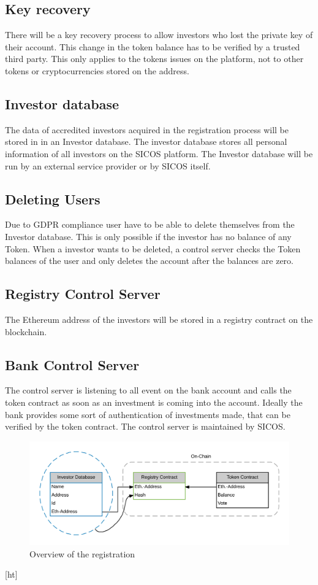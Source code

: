\documentclass[11pt]{article}
\begin{document}
\subsection{Key recovery}
There will be a key recovery process to allow investors who lost the private key of their account. This change in the token balance has to be verified by a trusted third party. This only applies to the tokens issues on the platform, not to other tokens or cryptocurrencies stored on the address. 


\subsection{Investor database}
The data of accredited investors acquired in the registration process will be stored in in an Investor database.
The investor database stores all personal information of all investors on the SICOS platform. The Investor database will be run by an external service provider or by SICOS itself. 


\subsection{Deleting Users}

Due to GDPR compliance user have to be able to delete themselves from the Investor database. This is only possible if the investor has no balance of any Token. When a investor wants to be deleted, a control server checks the Token balances of the user and only deletes the account after the balances are zero.

\subsection{Registry Control Server}

 The Ethereum address of the investors will be stored in a registry contract on the blockchain.

\subsection{Bank Control Server}
The control server is listening to all event on the bank account and calls the token contract as soon as an investment is coming into the account. Ideally the bank provides  some sort of authentication of investments made, that can be verified by the token contract. 
The control server is maintained by SICOS.


 \begin{figure}[ht]
\includegraphics[scale=0.20]{Sicos-Base-Reg-Token.png}
\caption{Overview of the registration }    
\end{figure}[ht]  
\end{document}
